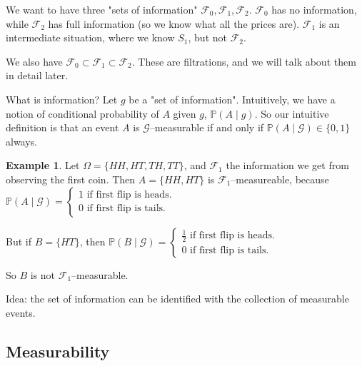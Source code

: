 \documentclass{article}
\theoremstyle{definition}
\newtheorem{example}{Example}[section]
\begin{document}
We want to have three "sets of information" $\mathcal{F}_0, \mathcal{F}_1, \mathcal{F}_2$. $\mathcal{F}_0$ has no information, while $\mathcal{F}_2$ has full information (so we know what all the prices are). $\mathcal{F}_1$ is an intermediate situation, where we know $S_1$, but not $\mathcal{F}_2$.

We also have $\mathcal{F}_0 \subset \mathcal{F}_1 \subset \mathcal{F}_2$. These are filtrations, and we will talk about them in detail later.

What is information? Let $g$ be a "set of information". Intuitively, we have a notion of conditional probability of $A$ given $g$, $\mathbb{P}(A \mid g)$. So our intuitive definition is that an event $A$ is $\mathcal{G}$--measurable if and only if $\mathbb{P}(A \mid \mathcal{G}) \in \{0,1\}$ always.
\begin{example}
    Let $\Omega = \{HH,HT,TH,TT\}$, and $\mathcal{F}_1$ the information we get from observing the first coin. Then $A = \{HH,HT\}$ is $\mathcal{F}_1$--measureable, because $\mathbb{P}(A \mid \mathcal{G}) = \begin{cases}
        1 \text{ if first flip is heads.}\\
        0 \text{ if first flip is tails.}
    \end{cases}$

    But if $B = \{HT\}$, then $\mathbb{P}(B \mid \mathcal{G}) = \begin{cases}
        \frac{1}{2} \text{ if first flip is heads.}\\
        0 \text{ if first flip is tails.}
    \end{cases}$

    So $B$ is not $\mathcal{F}_1$--measurable.
\end{example}
Idea: the set of information can be identified with the collection of measurable events.

\subsection{Measurability}

\end{document}
